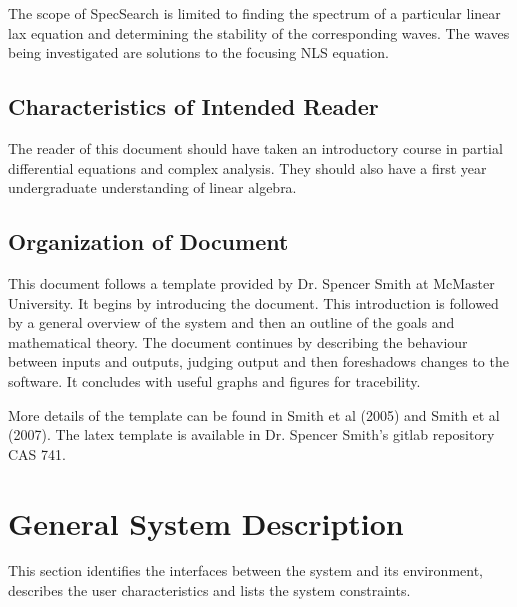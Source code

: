 \documentclass[12pt]{article}
\begin{document}
The scope of SpecSearch is limited to finding the spectrum of a particular 
linear lax equation and determining the stability of the corresponding waves. 
The waves being investigated are solutions to 
the focusing NLS equation. 

\subsection{Characteristics of Intended Reader} 

The reader of this document should have taken an introductory course 
in partial differential equations and complex analysis. They should also have a 
first year undergraduate understanding of linear algebra.

\subsection{Organization of Document}

This document follows a template provided by Dr. Spencer Smith at McMaster 
University. It begins by introducing the document. This introduction is 
followed by a general overview of the system and then an outline of the goals 
and mathematical theory. The document continues by describing the behaviour 
between inputs 
and outputs, judging output and then foreshadows changes to the software. It 
concludes with useful graphs and figures for tracebility. \\ 

More details of the template can be found in Smith et al (2005)  and Smith et al 
(2007). The latex template is available in Dr. Spencer Smith's gitlab 
repository CAS 741. 

\section{General System Description}

This section identifies the interfaces between the system and its environment,
describes the user characteristics and lists the system constraints.
\end{document}
